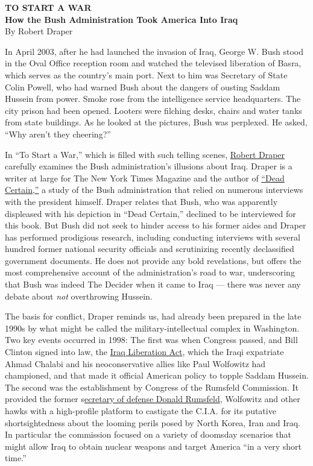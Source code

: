 \textbf{TO START A WAR}\\
\textbf{How the Bush Administration Took America Into Iraq}\\
By Robert Draper

In April 2003, after he had launched the invasion of Iraq, George W.
Bush stood in the Oval Office reception room and watched the televised
liberation of Basra, which serves as the country's main port. Next to
him was Secretary of State Colin Powell, who had warned Bush about the
dangers of ousting Saddam Hussein from power. Smoke rose from the
intelligence service headquarters. The city prison had been opened.
Looters were filching desks, chairs and water tanks from state
buildings. As he looked at the pictures, Bush was perplexed. He asked,
``Why aren't they cheering?''

In ``To Start a War,'' which is filled with such telling scenes,
\href{https://www.nytimes3xbfgragh.onion/by/robert-draper}{Robert
Draper} carefully examines the Bush administration's illusions about
Iraq. Draper is a writer at large for The New York Times Magazine and
the author of
\href{https://www.nytimes3xbfgragh.onion/2007/11/04/books/review/Lewis3-t.html}{``Dead
Certain,''} a study of the Bush administration that relied on numerous
interviews with the president himself. Draper relates that Bush, who was
apparently displeased with his depiction in ``Dead Certain,'' declined
to be interviewed for this book. But Bush did not seek to hinder access
to his former aides and Draper has performed prodigious research,
including conducting interviews with several hundred former national
security officials and scrutinizing recently declassified government
documents. He does not provide any bold revelations, but offers the most
comprehensive account of the administration's road to war, underscoring
that Bush was indeed The Decider when it came to Iraq --- there was
never any debate about \emph{not} overthrowing Hussein.

The basis for conflict, Draper reminds us, had already been prepared in
the late 1990s by what might be called the military-intellectual complex
in Washington. Two key events occurred in 1998: The first was when
Congress passed, and Bill Clinton signed into law, the
\href{https://www.congress.gov/bill/105th-congress/house-bill/4655}{Iraq
Liberation Act}, which the Iraqi expatriate Ahmad Chalabi and his
neoconservative allies like Paul Wolfowitz had championed, and that made
it official American policy to topple Saddam Hussein. The second was the
establishment by Congress of the Rumsfeld Commission. It provided the
former
s\href{https://history.defense.gov/Multimedia/Biographies/Article-View/Article/571280/donald-h-rumsfeld/}{ecretary
of defense Donald Rumsfeld}, Wolfowitz and other hawks with a
high-profile platform to castigate the C.I.A. for its putative
shortsightedness about the looming perils posed by North Korea, Iran and
Iraq. In particular the commission focused on a variety of doomsday
scenarios that might allow Iraq to obtain nuclear weapons and target
America ``in a very short time.''

